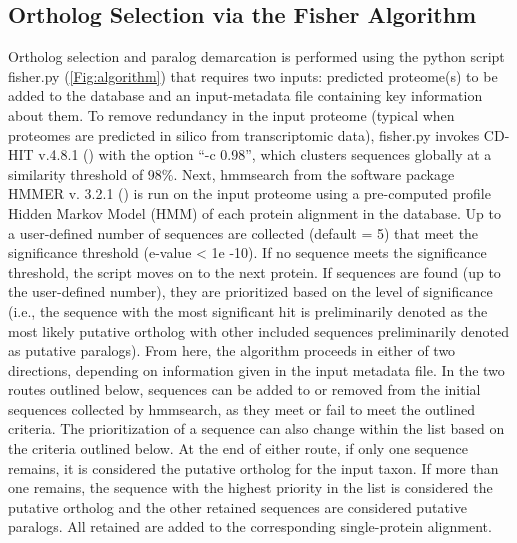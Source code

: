\documentclass{article}
\begin{document}
        \subsection{Ortholog Selection via the Fisher Algorithm}
            Ortholog selection and paralog demarcation is performed using the python script fisher.py (\autoref{Fig:algorithm}) that requires two inputs: predicted proteome(s) to be added to the database and an input-metadata file containing key information about them. To remove redundancy in the input proteome (typical when proteomes are predicted in silico from transcriptomic data), fisher.py invokes CD-HIT v.4.8.1 (\cite{fu_cd-hit_2012}) with the option “-c 0.98”, which clusters sequences globally at a similarity threshold of 98\%. Next, hmmsearch from the software package HMMER v. 3.2.1 (\cite{mistry_challenges_2013}) is run on the input proteome using a pre-computed profile Hidden Markov Model (HMM) of each protein alignment in the database. Up to a user-defined number of sequences are collected (default = 5) that meet the significance threshold (e-value < 1e -10). If no sequence meets the significance threshold, the script moves on to the next protein. If sequences are found (up to the user-defined number), they are prioritized based on the level of significance (i.e., the sequence with the most significant hit is preliminarily denoted as the most likely putative ortholog with other included sequences preliminarily denoted as putative paralogs). From here, the algorithm proceeds in either of two directions, depending on information given in the input metadata file. In the two routes outlined below, sequences can be added to or removed from the initial sequences collected by hmmsearch, as they meet or fail to meet the outlined criteria. The prioritization of a sequence can also change within the list based on the criteria outlined below. At the end of either route, if only one sequence remains, it is considered the putative ortholog for the input taxon. If more than one remains, the sequence with the highest priority in the list is considered the putative ortholog and the other retained sequences are considered putative paralogs. All retained are added to the corresponding single-protein alignment.
            
\end{document}
